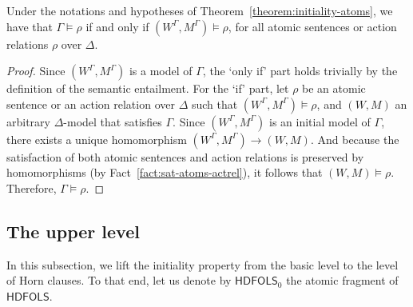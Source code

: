 \documentclass[a4paper,UKenglish,cleveref, autoref]{lipics-v2019}
\newcommand{\HDFOLS}{{\mathsf{HDFOLS}}}
\renewcommand{\models}{\vDash}
\begin{document}
\begin{corollary} \label{corollary:initiality-atoms}
  Under the notations and hypotheses of Theorem~\ref{theorem:initiality-atoms}, we have that\/
  \(\Gamma \models \rho\) if and only if \((W^{\Gamma}, M^{\Gamma}) \models \rho\),
  for all atomic sentences or action relations \(\rho\) over \(\Delta\).
\end{corollary}
\begin{proof}
  Since \((W^{\Gamma}, M^{\Gamma})\) is a model of \(\Gamma\), the `only if' part holds trivially by the definition of the semantic entailment.
  For the `if' part, let \(\rho\) be an atomic sentence or an action relation over \(\Delta\) such that \((W^{\Gamma}, M^{\Gamma}) \models \rho\), and \((W, M)\) an arbitrary \(\Delta\)-model that satisfies \(\Gamma\).
  Since \((W^{\Gamma}, M^{\Gamma})\) is an initial model of \(\Gamma\), there exists a unique homomorphism \((W^{\Gamma}, M^{\Gamma}) \to (W, M)\).
  And because the satisfaction of both atomic sentences and action relations is preserved by homomorphisms (by Fact~\ref{fact:sat-atoms-actrel}), it follows that \((W, M) \models \rho\).
  Therefore, \(\Gamma \models \rho\).
\end{proof}


\subsection{The upper level}

In this subsection, we lift the initiality property from the basic level to the level of Horn clauses.
To that end, let us denote by \(\HDFOLS_{0}\) the atomic fragment of \(\HDFOLS\).
\end{document}
